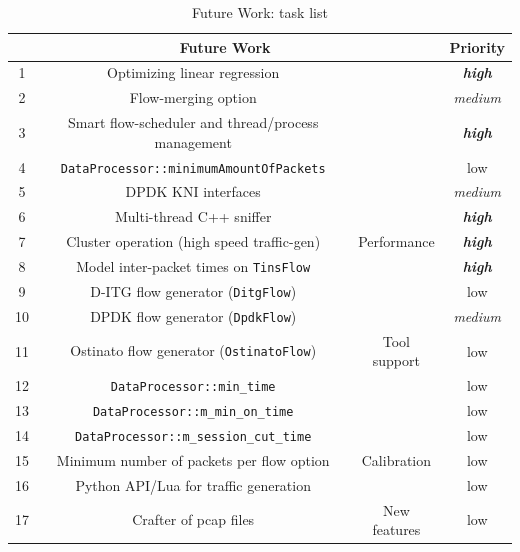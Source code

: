 \begin{table}[ht!]
	\centering
	\caption{Future Work: task list}
	\label{tab:task-list}
	\begin{tabular}{cccc}
		\hline
		\multicolumn{3}{c}{Future Work}	& Priority \\ \hline
		1   & Optimizing linear regression                       &                                & \textbf{\textit{high}} \\
		2   & Flow-merging option                                &                                & \textit{medium} \\
		3   & Smart flow-scheduler and thread/process management &                                & \textbf{\textit{high}} \\
		4   & \texttt{DataProcessor::minimumAmountOfPackets}     &                                & low \\
		5   & DPDK KNI interfaces                                &                                & \textit{medium} \\
		6   & Multi-thread C++ sniffer                           &                                & \textbf{\textit{high}} \\ 
		7   & Cluster operation (high speed traffic-gen)         & \multirow{-7}{*}{Performance}  & \textbf{\textit{high}} \\ \hline
		8   & Model inter-packet times on \texttt{TinsFlow}      &                                & \textbf{\textit{high}} \\
		9   & D-ITG flow generator (\texttt{DitgFlow})           &                                & low \\
		10  & DPDK flow generator (\texttt{DpdkFlow})            &                                & \textit{medium} \\
		11  & Ostinato flow generator (\texttt{OstinatoFlow})    & \multirow{-4}{*}{Tool support} & low \\ \hline
		12  & \texttt{DataProcessor::min\_time}                  &                                & low \\
		13  & \texttt{DataProcessor::m\_min\_on\_time}           &                                & low \\
		14  & \texttt{DataProcessor::m\_session\_cut\_time}      &                                & low \\
		15  & Minimum number of packets per flow option          & \multirow{-4}{*}{Calibration}  & low \\ \hline
		16  & Python API/Lua for traffic generation              &                                & low \\
		17  & Crafter of  pcap files                             & \multirow{-2}{*}{New features} & low \\

		\hline
	\end{tabular}
\end{table}



